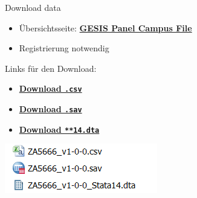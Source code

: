 \documentclass[ignorenonframetext,]{beamer}
\providecommand{\tightlist}{%
  \setlength{\itemsep}{0pt}\setlength{\parskip}{0pt}}
\begin{document}
\begin{frame}[fragile]{Download data}

\begin{itemize}
\tightlist
\item
  Übersichtsseite:
  \href{https://www.gesis.org/gesis-panel/data/gesis-panel-campus-file/}{\textbf{GESIS
  Panel Campus File}}
\item
  Registrierung notwendig
\end{itemize}

\begin{block}{Links für den Download:}

\begin{itemize}
\tightlist
\item
  \href{https://dbk.gesis.org/dbksearch/download.asp?db=D\&id=62367}{\textbf{Download
  \texttt{.csv}}}
\item
  \href{https://dbk.gesis.org/dbksearch/download.asp?db=D\&id=62369}{\textbf{Download
  \texttt{.sav}}}
\item
  \href{https://dbk.gesis.org/dbksearch/download.asp?db=D\&id=62371}{\textbf{Download
  \texttt{**14.dta}}}
\end{itemize}

\includegraphics{figure/filenamesGP2.PNG}

\end{block}

\end{frame}
\end{document}
